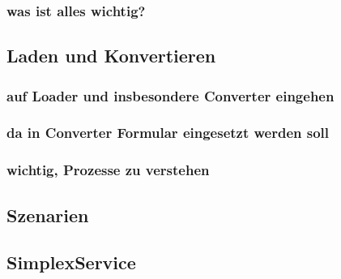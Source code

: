 \documentclass[oneside,a4paper,11pt,openright]{scrreprt}
\begin{document}
\subsubsection{was ist alles wichtig?}
\subsection{Laden und Konvertieren}
\label{sec:simplex-importer}
\subsubsection{auf Loader und insbesondere Converter eingehen}
\subsubsection{da in Converter Formular eingesetzt werden soll}
\subsubsection{wichtig, Prozesse zu verstehen}
\subsection{Szenarien}
\label{sec:simplex-scenarios}
\subsection{SimplexService}
\label{sec:simplex-service}

\clearpage




\end{document}
